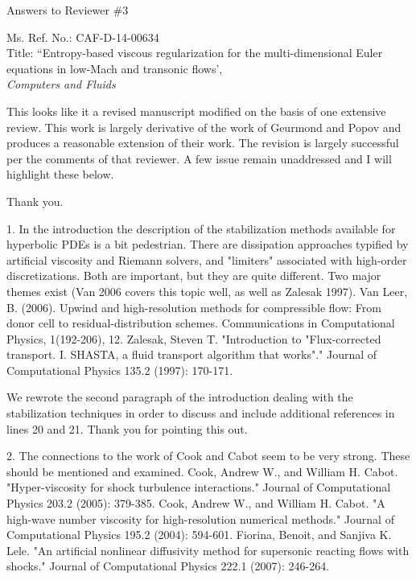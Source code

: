 \documentclass{article}
\newcommand{\tcr}[1]{\textcolor{red}{#1}}
\newcommand{\tcb}[1]{\textcolor{blue}{#1}}
\begin{document}

\begin{center}
{ \Large Answers to Reviewer \#3}
\end{center}

\bigskip

\noindent Ms. Ref. No.: CAF-D-14-00634\\
Title: ``Entropy-based viscous regularization for the multi-dimensional Euler equations in low-Mach and transonic flows', \\
{\it Computers and Fluids}\\

\bigskip
\bigskip

{
\color{blue}
This looks like it a revised manuscript modified on the basis of one
extensive review.
This work is largely derivative of the work of Geurmond and Popov and
produces a reasonable extension of their work. The revision is largely
successful per the comments of that reviewer. A few issue remain
unaddressed and I will highlight these below.
}

Thank you.

\bigskip

{
\color{blue}
1. In the introduction the description of the stabilization methods
available for hyperbolic PDEs is a bit pedestrian. There are dissipation
approaches typified by artificial viscosity and Riemann solvers, and
"limiters" associated with high-order discretizations. Both are important,
but they are quite different. Two major themes exist (Van 2006 covers
this topic well, as well as Zalesak 1997).
Van Leer, B. (2006). Upwind and high-resolution methods for
compressible flow: From donor cell to residual-distribution schemes.
Communications in Computational Physics, 1(192-206), 12.
Zalesak, Steven T. "Introduction to "Flux-corrected transport. I. SHASTA,
a fluid transport algorithm that works"." Journal of Computational Physics
135.2 (1997): 170-171.}

We rewrote the second paragraph of the introduction dealing with the stabilization techniques
in order to discuss and include additional references in lines 20 and 21. Thank you for pointing this out.

\bigskip


{
\color{blue}
2. The connections to the work of Cook and Cabot seem to be very
strong. These should be mentioned and examined.
Cook, Andrew W., and William H. Cabot. "Hyper-viscosity for shock turbulence
interactions." Journal of Computational Physics 203.2 (2005):
379-385.
Cook, Andrew W., and William H. Cabot. "A high-wave number viscosity
for high-resolution numerical methods." Journal of Computational Physics
195.2 (2004): 594-601.
Fiorina, Benoit, and Sanjiva K. Lele. "An artificial nonlinear diffusivity
method for supersonic reacting flows with shocks." Journal of
Computational Physics 222.1 (2007): 246-264.}
\end{document}
